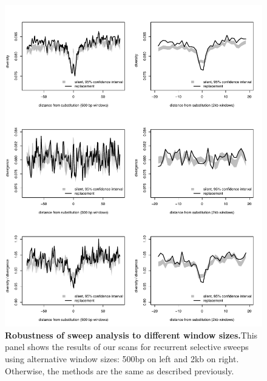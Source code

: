 \begin{figure}[h!]
      \centering
       \includegraphics[width=\linewidth]{Ch2FigS8}
    \caption{\textbf{Robustness of sweep analysis to different window sizes.}This panel shows the results of our scans for recurrent selective sweeps using alternative window sizes: 500bp on left and 2kb on right. Otherwise, the methods are the same as described previously.}
    \label{fig:figS8}
\end{figure}

